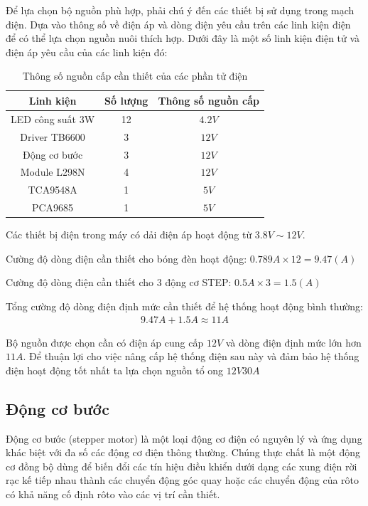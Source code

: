 Để lựa chọn bộ nguồn phù hợp, phải chú ý đến các thiết bị sử dụng trong mạch điện. Dựa vào thông số về điện áp và dòng điện yêu cầu trên các linh kiện điện để có thể lựa chọn nguồn nuôi thích hợp. Dưới đây là một số linh kiện điện tử và điện áp yêu cầu của các linh kiện đó:
\begin{table}[H]
\centering
\begin{tabular}{|c|c|c|}
\hline 
Linh kiện & Số lượng & Thông số nguồn cấp \\ 
\hline 
LED công suất 3W & 12 & $ 4.2V $ \\ 
\hline 
Driver TB6600 & 3 & $ 12V $ \\ 
\hline 
Động cơ bước & 3 & $ 12V $ \\ 
\hline 
Module L298N & 4 & $ 12V $ \\ 
\hline 
TCA9548A & 1 & $ 5V $ \\ 
\hline 
PCA9685 & 1 & $ 5V $ \\ 
\hline 
\end{tabular} 
\caption{Thông số nguồn cấp cần thiết của các phần tử điện}
\label{tab:nguoncap}
\end{table}

Các thiết bị điện trong máy có dải điện áp hoạt động từ $ 3.8V \sim 12V $.

Cường độ dòng điện cần thiết cho bóng đèn hoạt động: $ 0.789A \times 12 = 9.47(A) $

Cường độ dòng điện cần thiết cho 3 động cơ STEP: $ 0.5A \times 3 = 1.5(A) $

Tổng cường độ dòng điện định mức cần thiết để hệ thống hoạt động bình thường: 
\begin{align*}
9.47A + 1.5A \approx 11A
\end{align*} 

Bộ nguồn được chọn cần có điện áp cung cấp $ 12V $ và dòng điện định mức lớn hơn $ 11A $. Để thuận lợi cho việc nâng cấp hệ thống điện sau này và đảm bảo hệ thống điện hoạt động tốt nhất ta lựa chọn nguồn tổ ong $ 12V30A $

\subsection{Động cơ bước}
Động cơ bước (stepper motor) là một loại động cơ điện có nguyên lý và ứng dụng khác biệt với đa số các động cơ điện thông thường. Chúng thực chất là một động cơ đồng bộ dùng để biến đổi các tín hiệu điều khiển dưới dạng các xung điện rời rạc kế tiếp nhau thành các chuyển động góc quay hoặc các chuyển động của rôto có khả năng cố định rôto vào các vị trí cần thiết.

